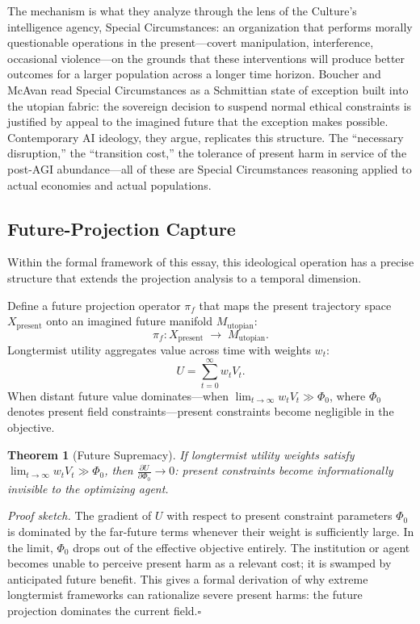 \documentclass[12pt, a4paper]{article}
\theoremstyle{plain}
\newtheorem{theorem}{Theorem}
\theoremstyle{definition}
\theoremstyle{remark}
\begin{document}
The mechanism is what they analyze through the lens of the Culture's intelligence
agency, Special Circumstances: an organization that performs morally questionable
operations in the present---covert manipulation, interference, occasional violence---on
the grounds that these interventions will produce better outcomes for a larger
population across a longer time horizon.
Boucher and McAvan read Special Circumstances as a Schmittian state of exception
built into the utopian fabric: the sovereign decision to suspend normal ethical
constraints is justified by appeal to the imagined future that the exception makes
possible.
Contemporary AI ideology, they argue, replicates this structure.
The ``necessary disruption,'' the ``transition cost,'' the tolerance of present
harm in service of the post-AGI abundance---all of these are Special Circumstances
reasoning applied to actual economies and actual populations.

\subsection{Future-Projection Capture}

Within the formal framework of this essay, this ideological operation has a precise
structure that extends the projection analysis to a temporal dimension.

Define a future projection operator $\pi_f$ that maps the present trajectory space
$X_{\mathrm{present}}$ onto an imagined future manifold $M_{\mathrm{utopian}}$:
\[
\pi_f : X_{\mathrm{present}} \;\rightarrow\; M_{\mathrm{utopian}}.
\]
Longtermist utility aggregates value across time with weights $w_t$:
\[
U = \sum_{t=0}^{\infty} w_t V_t.
\]
When distant future value dominates---when $\lim_{t \to \infty} w_t V_t \gg \Phi_0$,
where $\Phi_0$ denotes present field constraints---present constraints become
negligible in the objective.

\begin{theorem}[Future Supremacy]
If longtermist utility weights satisfy $\lim_{t\to\infty} w_t V_t \gg \Phi_0$,
then $\tfrac{\partial U}{\partial \Phi_0} \to 0$: present constraints become
informationally invisible to the optimizing agent.
\end{theorem}

\textit{Proof sketch.}
The gradient of $U$ with respect to present constraint parameters $\Phi_0$ is
dominated by the far-future terms whenever their weight is sufficiently large.
In the limit, $\Phi_0$ drops out of the effective objective entirely.
The institution or agent becomes unable to perceive present harm as a relevant
cost; it is swamped by anticipated future benefit.
This gives a formal derivation of why extreme longtermist frameworks can rationalize
severe present harms: the future projection dominates the current field.\hfill$\square$
\end{document}
